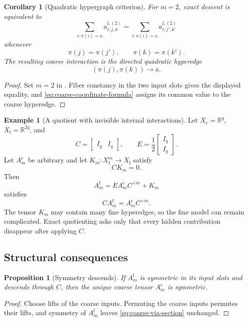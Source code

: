 \documentclass[11pt]{article}
\newtheorem{proposition}[theorem]{Proposition}
\newtheorem{corollary}[theorem]{Corollary}
\theoremstyle{definition}
\newtheorem{example}[theorem]{Example}
\theoremstyle{remark}
\newcommand{\R}{\mathbb R}
\newcommand{\fine}{\mathrm f}
\newcommand{\coarse}{\mathrm c}
\begin{document}
\begin{corollary}[Quadratic hypergraph criterion]\label{cor:quadratic-criterion}
For $m=2$, exact descent is equivalent to
\[
  \sum_{i:\pi(i)=a}a^{\fine,(2)}_{i;j,k}
  =
  \sum_{i:\pi(i)=a}a^{\fine,(2)}_{i;j',k'}
\]
whenever
\[
  \pi(j)=\pi(j'),
  \qquad
  \pi(k)=\pi(k').
\]
The resulting coarse interaction is the directed quadratic hyperedge
\[
  (\pi(j),\pi(k))\longrightarrow a.
\]
\end{corollary}

\begin{proof}
Set $m=2$ in .  Fiber constancy in the two input slots gives the displayed equality, and \eqref{eq:coarse-coordinate-formula} assigns its common value to the coarse hyperedge.
\end{proof}

\begin{example}[A quotient with invisible internal interactions]\label{ex:invisible-interactions}
Let $X_{\coarse}=\R^q$, $X_{\fine}=\R^{2q}$, and
\[
  C=\begin{bmatrix}I_q&I_q\end{bmatrix},
  \qquad
  E=\frac12\begin{bmatrix}I_q\\I_q\end{bmatrix}.
\]
Let $A_m^{\coarse}$ be arbitrary and let $K_m:X_{\fine}^m\to X_{\fine}$ satisfy
\[
  CK_m=0.
\]
Then
\begin{equation}\label{eq:exact-lift-construction}
  A_m^{\fine}
  =
  EA_m^{\coarse}C^{\times m}+K_m
\end{equation}
satisfies
\[
  CA_m^{\fine}=A_m^{\coarse}C^{\times m}.
\]
The tensor $K_m$ may contain many fine hyperedges, so the fine model can remain complicated.  Exact quotienting asks only that every hidden contribution disappear after applying $C$.
\end{example}

\subsection{Structural consequences}

\begin{proposition}[Symmetry descends]\label{prop:symmetry-descends}
If $A_m^{\fine}$ is symmetric in its input slots and descends through $C$, then the unique coarse tensor $A_m^{\coarse}$ is symmetric.
\end{proposition}

\begin{proof}
Choose lifts of the coarse inputs.  Permuting the coarse inputs permutes their lifts, and symmetry of $A_m^{\fine}$ leaves \eqref{eq:coarse-via-section} unchanged.
\end{proof}
\end{document}
